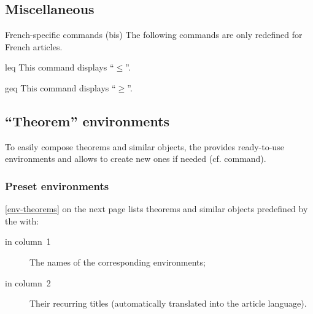 \documentclass[english,nolocaltoc]{nwejmart}
\newtheorem[style=definition]{fact}
\newtheorem[title-plural=Criteria]{criterion}
\newtheorem[title=random experiment]{rexp}
\begin{document}
\subsection{Miscellaneous}

\begin{dbremark}{French-specific commands (bis)}{}
  The following commands are only redefined for French articles.
\end{dbremark}

\begin{docCommand}{leq}{}
  This command displays \enquote{$\leqslant$}.
\end{docCommand}
\begin{docCommand}{geq}{}
  This command displays \enquote{$\geqslant$}.
\end{docCommand}

\subsection{\enquote{Theorem} environments}

To easily compose theorems and similar objects, the 
\nwejmauthorcl{} provides ready-to-use environments and allows to
create new ones if needed (cf.  command).

\subsubsection{Preset environments}
\label{sec:envir-de-type}

\vref{env-theorems} on the next page lists  theorems and similar
objects predefined by the
\nwejmauthorcl{} with:
\begin{description}
\item[in column~1] The names of the corresponding environments;
\item[in column~2] Their recurring titles (automatically translated into
  the article language).
\end{description}
\end{document}
